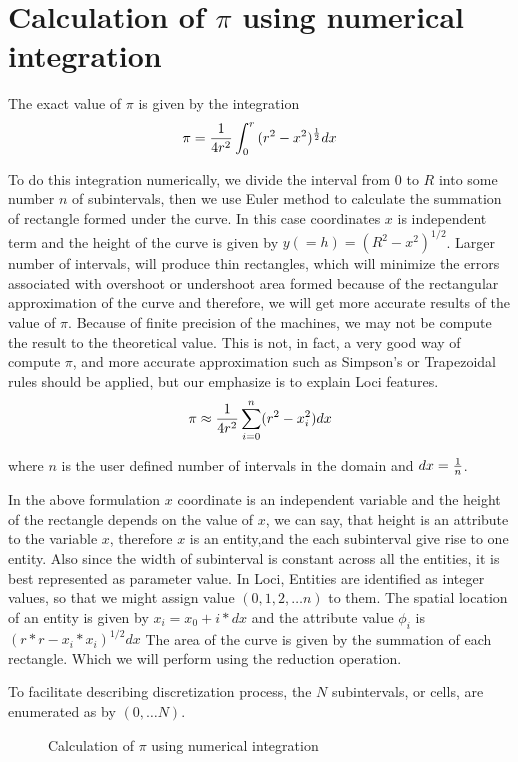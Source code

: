\section { Calculation of $\pi$ using numerical integration }
%
The exact value of ${\pi}$ is given by the integration
%
\begin{equation}
\pi = {1 \over 4 r^2}\int_{0}^{r} {(r^2-x^2)^{1\over2} dx}
\end{equation}
%
\par \par To do this integration numerically, we divide the interval from $0$ to $R$ into 
some number $n$  of subintervals, then we use Euler method to calculate the summation
of rectangle formed under the curve. In this case coordinates $x$ is independent
term and the height of the curve is given by $y(=h) = (R^2-x^2)^{1/2}$. 
Larger number of intervals, will produce thin rectangles, which will minimize the
errors associated with overshoot or undershoot area formed because of the rectangular
approximation of the curve and therefore, we will get more accurate results of
the value of $\pi$. Because of finite precision of the machines, we may not be
compute the result to the theoretical value.  This is not, in fact, a very good way 
of compute $\pi$, and more accurate approximation such as Simpson's or Trapezoidal
rules should be applied, but our emphasize is to explain Loci features.
\begin{equation}
\pi \approx {1 \over 4 r^2}\sum_{i=0}^{n}(r^2-x_i^2)dx
\end{equation}

where  $n$ is the user defined number of intervals in the domain and 
$dx = {1\over n}$. 

In the above formulation $x$ coordinate is an independent variable and the
height of the rectangle depends on the value of $x$, we can say, that height
is an attribute to the variable $x$, therefore $x$ is an entity,and the
each subinterval give rise to one entity. Also since the width of subinterval
is constant across all the entities, it is best represented as parameter value.
In Loci, Entities are identified as integer values, so that we might assign value
$(0,1,2, \dots n)$ to them.  The spatial location of an entity is given
by $x_i = x_0 + i*dx$ and the attribute value $\phi_i$ is $(r*r-x_i*x_i)^{1/2}dx$
The area of the curve is given by the summation of each rectangle. Which we 
will perform using the reduction operation.


To facilitate describing discretization process, the
$N$ subintervals, or cells, are enumerated as by $(0, \dots N)$. 
%
\begin{figure}[h]
\vspace*{3.50in}\caption {Calculation of $\pi$ using numerical integration}
\end{figure}
%
